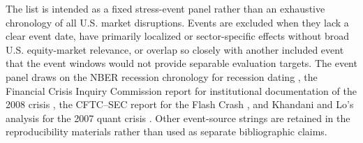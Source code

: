 \documentclass[pdflatex,sn-mathphys-num]{sn-jnl}
\begin{document}
The list is intended as a fixed stress-event panel rather than an exhaustive chronology of all U.S. market disruptions. Events are excluded when they lack a clear event date, have primarily localized or sector-specific effects without broad U.S. equity-market relevance, or overlap so closely with another included event that the event windows would not provide separable evaluation targets. The event panel draws on the NBER recession chronology for recession dating \cite{nber2023}, the Financial Crisis Inquiry Commission report for institutional documentation of the 2008 crisis \cite{fcic2011}, the CFTC--SEC report for the Flash Crash \cite{cftcsec2010}, and Khandani and Lo's analysis for the 2007 quant crisis \cite{khandani2007}. Other event-source strings are retained in the reproducibility materials rather than used as separate bibliographic claims.
\end{document}
